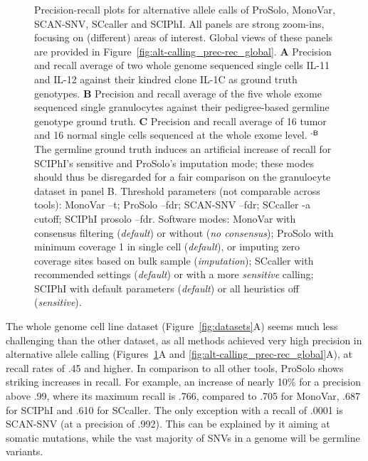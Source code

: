 \documentclass[12pt,inline]{wlscirep}
\begin{document}
\begin{figure}[!tpb]
 \caption{
  Precision-recall plots for alternative allele calls of ProSolo, MonoVar, SCAN-SNV, SCcaller and SCIPhI.
  All panels are strong zoom-ins, focusing on (different) areas of interest.
  Global views of these panels are provided in Figure~\ref{fig:alt-calling_prec-rec_global}.
  \textbf{A} Precision and recall average of two whole genome sequenced single cells IL-11 and IL-12 against their kindred clone IL-1C as ground truth genotypes.
  \textbf{B} Precision and recall average of the five whole exome sequenced single granulocytes against their pedigree-based germline genotype ground truth.
  \textbf{C} Precision and recall average of 16 tumor and 16 normal single cells sequenced at the whole exome level. \newline
  $^\text{\sffamily-B}$ The germline ground truth induces an artificial increase of recall for SCIPhI's sensitive and ProSolo's imputation mode; these modes should thus be disregarded for a fair comparison on the granulocyte dataset in panel B. \newline \footnotesize
  Threshold parameters (not comparable across tools):
  MonoVar {\ttfamily --t};
  ProSolo {\ttfamily --fdr};
  SCAN-SNV {\ttfamily --fdr};
  SCcaller {\ttfamily -a cutoff};
  SCIPhI {\ttfamily prosolo --fdr}.
  Software modes:
  MonoVar with consensus filtering ({\itshape default}) or without ({\itshape no consensus});
  ProSolo with minimum coverage 1 in single cell ({\itshape default}), or imputing zero coverage sites based on bulk sample ({\itshape imputation});
  SCcaller with recommended settings ({\itshape default}) or with a more {\itshape sensitive} calling;
  SCIPhI with default parameters ({\itshape default}) or all heuristics off ({\itshape sensitive}).
 }
\label{fig:alt-calling_prec-rec}
\end{figure}

The whole genome cell line dataset (Figure~\ref{fig:datasets}A) seems much less challenging than the other dataset, as all methods achieved very high precision in alternative allele calling (Figures~\ref{fig:alt-calling_prec-rec}A and \ref{fig:alt-calling_prec-rec_global}A), at recall rates of .45 and higher. 
In comparison to all other tools, ProSolo shows striking increases in recall.
For example, an increase of nearly 10\% for a precision above .99, where its maximum recall is .766, compared to .705 for MonoVar, .687 for SCIPhI and .610 for SCcaller.
The only exception with a recall of .0001 is SCAN-SNV (at a precision of .992).
This can be explained by it aiming at somatic mutations, while the vast majority of SNVs in a genome will be germline variants.
\end{document}
